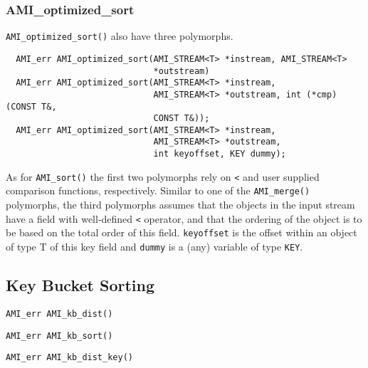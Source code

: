 \subsubsection{AMI\_optimized\_sort}

\verb|AMI_optimized_sort()| also have three polymorphs.

\begin{verbatim}
  AMI_err AMI_optimized_sort(AMI_STREAM<T> *instream, AMI_STREAM<T>
                             *outstream) 
  AMI_err AMI_optimized_sort(AMI_STREAM<T> *instream,
                             AMI_STREAM<T> *outstream, int (*cmp)(CONST T&,
                             CONST T&)); 
  AMI_err AMI_optimized_sort(AMI_STREAM<T> *instream,
                             AMI_STREAM<T> *outstream, 
                             int keyoffset, KEY dummy);
\end{verbatim}

As for \verb|AMI_sort()| the first two polymorphs rely on \verb|<| and user
supplied comparison functions, respectively. Similar to one of the
\verb|AMI_merge()| polymorphs, the third polymorphs assumes that the
objects in the input stream have a field with well-defined \verb|<|
operator, and that the ordering of the object is to be based on the total
order of this field. \verb|keyoffset| is the offset within an object of
type T of this key field and \verb|dummy| is a (any) variable of type
\verb|KEY|.


\subsection{Key Bucket Sorting}
\label{sec:ref-ami-kb-sort}


\tobeextended

\begin{verbatim}
AMI_err AMI_kb_dist()
\end{verbatim}

\begin{verbatim}
AMI_err AMI_kb_sort()
\end{verbatim}

\begin{verbatim}
AMI_err AMI_kb_dist_key()
\end{verbatim}

